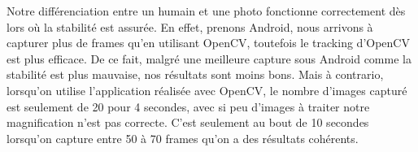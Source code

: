 Notre différenciation entre un humain et une photo fonctionne correctement dès lors où la stabilité est assurée. En effet, prenons Android, nous arrivons
à capturer plus de frames qu'en utilisant OpenCV, toutefois le tracking d'OpenCV est plus efficace. De ce fait, malgré une meilleure capture sous Android 
comme la stabilité est plus mauvaise, nos résultats sont moins bons. Mais à contrario, lorsqu'on utilise l'application réalisée avec OpenCV, le nombre d'images
capturé est seulement de 20 pour 4 secondes, avec si peu d'images à traiter notre magnification n'est pas correcte. C'est seulement au bout de 10 secondes
lorsqu'on capture entre 50 à 70 frames qu'on a des résultats cohérents. 

